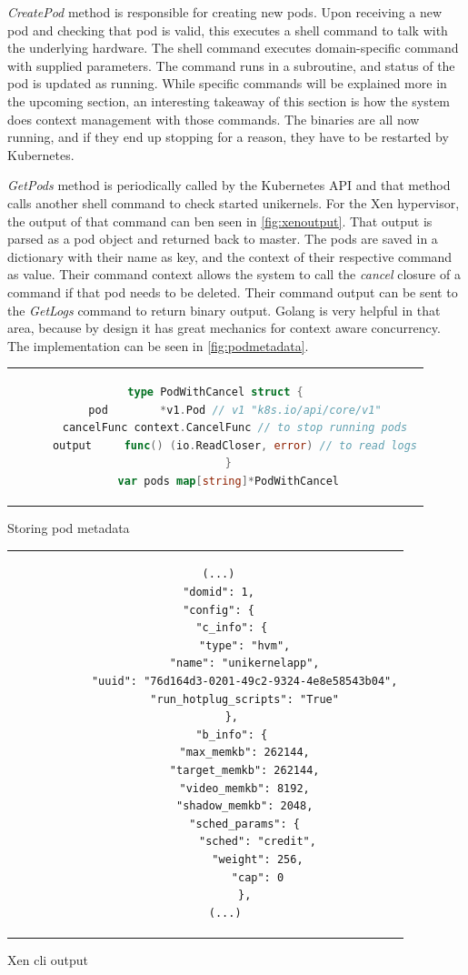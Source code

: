 \textit{CreatePod} method is responsible for creating new pods. Upon receiving a new pod and checking that pod is valid, this  executes a shell command to talk with the underlying hardware. The shell command executes domain-specific command with supplied parameters. The command runs in a subroutine, and status of the pod is updated as running. While specific commands will be explained more in the upcoming section, an interesting takeaway of this section is how the system does context management with those commands. The binaries are all now running, and if they end up stopping for a reason, they have to be restarted by Kubernetes.

\textit{GetPods} method is periodically called by the Kubernetes API and that method calls another shell command to check started unikernels. For the Xen hypervisor, the output of that command can ben seen in \ref{fig:xenoutput}. That output is parsed as a pod object and returned back to master. The pods are saved in a dictionary with their name as key, and the context of their respective command as value. Their command context allows the system to call the \textit{cancel} closure of a command if that pod needs to be deleted. Their command output can be sent to the \textit{GetLogs} command to return binary output. Golang is very helpful in that area, because by design it has great mechanics for context aware concurrency. The implementation can be seen in \ref{fig:podmetadata}.
\begin{code}[htpb]
  \centering
  \begin{tabular}{c}
  \begin{lstlisting}[language=go]
    type PodWithCancel struct {
      pod        *v1.Pod // v1 "k8s.io/api/core/v1"
      cancelFunc context.CancelFunc // to stop running pods
      output     func() (io.ReadCloser, error) // to read logs
    }
    var pods map[string]*PodWithCancel
\end{lstlisting}
\end{tabular}
\caption{Storing pod metadata}\label{fig:podmetadata}
\end{code}

\begin{code}[!h]
  \centering
  \begin{tabular}{c}
  \begin{lstlisting}
    (...)
    "domid": 1,
    "config": {
        "c_info": {
            "type": "hvm",
            "name": "unikernelapp",
            "uuid": "76d164d3-0201-49c2-9324-4e8e58543b04",
            "run_hotplug_scripts": "True"
        },
        "b_info": {
            "max_memkb": 262144,
            "target_memkb": 262144,
            "video_memkb": 8192,
            "shadow_memkb": 2048,
            "sched_params": {
                "sched": "credit",
                "weight": 256,
                "cap": 0
            },
      (...)
\end{lstlisting}
\end{tabular}
\caption{Xen cli output}\label{fig:xenoutput}
\end{code}




